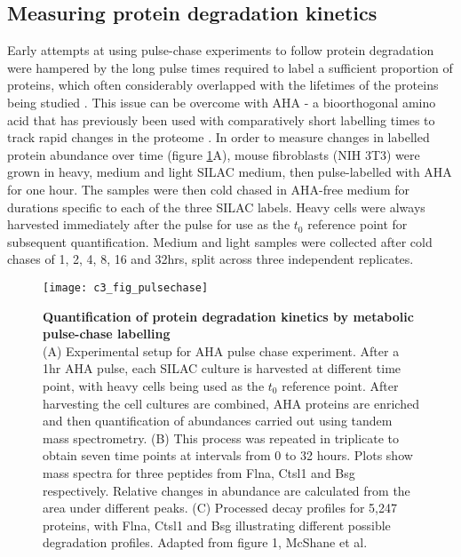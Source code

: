 \documentclass[a4paper,11pt,twoside,openright]{scrbook}
\begin{document}
\subsection{Measuring protein degradation kinetics}
Early attempts at using pulse-chase experiments to follow protein degradation were hampered by the long pulse times required to label a sufficient proportion of proteins, which often considerably overlapped with the lifetimes of the proteins being studied \cite{Larance2013}. This issue can be overcome with AHA - a bioorthogonal amino acid that has previously been used with comparatively short labelling times to track rapid changes in the proteome \cite{Eichelbaum2014}. In order to measure changes in labelled protein abundance over time (figure \ref{figure:pulsechase}A), mouse fibroblasts (NIH 3T3) were grown in heavy, medium and light SILAC medium, then pulse-labelled with AHA for one hour. The samples were then cold chased in AHA-free medium for durations specific to each of the three SILAC labels. Heavy cells were always harvested immediately after the pulse for use as the $t_{0}$ reference point for subsequent quantification. Medium and light samples were collected after cold chases of 1, 2, 4, 8, 16 and 32hrs, split across three independent replicates.

\begin{figure}
    \texttt{[image: c3\_fig\_pulsechase]}
    \caption[Quantification of protein degradation kinetics by metabolic pulse-chase labelling]{\sffamily \textbf{Quantification of protein degradation kinetics by metabolic pulse-chase labelling} \\ \small (A) Experimental setup for AHA pulse chase experiment. After a 1hr AHA pulse, each SILAC culture is harvested at different time point, with heavy cells being used as the $t_{0}$ reference point. After harvesting the cell cultures are combined, AHA proteins are enriched and then quantification of abundances carried out using tandem mass spectrometry. (B) This process was repeated in triplicate to obtain seven time points at intervals from 0 to 32 hours. Plots show mass spectra for three peptides from Flna, Ctsl1 and Bsg respectively. Relative changes in abundance are calculated from the area under different peaks. (C) Processed decay profiles for 5,247 proteins, with Flna, Ctsl1 and Bsg illustrating different possible degradation profiles. Adapted from figure 1, McShane et al.\cite{McShane2016}}
    \label{figure:pulsechase}
\end{figure}
\end{document}
